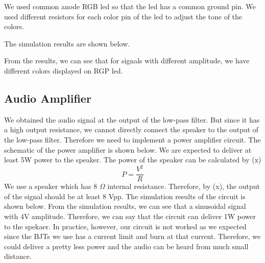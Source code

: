 \documentclass[conference]{IEEEtran}
\begin{document}
\par We used common anode RGB led so that the led has a common ground pin. We used different resistors for each color pin of the led 
to adjust the tone of the colors. 

\par The simulation results are shown below.
\par From the results, we can see that for signals with different amplitude, we have different colors displayed on RGP led.

\subsection{Audio Amplifier}
We obtained the audio signal at the output of the low-pass filter. But since it has a high output resistance, we cannot directly connect 
the speaker to the output of the low-pass filter. Therefore we need to implement a power amplifier circuit. The schematic of the power 
amplifier is shown below. 
We are expected to deliver at least 5W power to the speaker. The power of the speaker can be calculated by (x)
\begin{equation}
    P = \frac{V^2}{R}
\end{equation}
We use a speaker which has 8 \(\Omega\) internal resistance. Therefore, by (x), the output of the signal should be at least 8 Vpp. The 
simulation results of the circuit is shown below. 
From the simulation results,\cite{LM741} we can see that a sinusoidal signal with 4V amplitude. Therefore, we can say that the circuit can deliver 
1W power to the spekaer. In practice, however, our circuit is not worked as we expected since the BJTs we use has a current limit and burn 
at that current. Therefore, we could deliver a pretty less power and the audio can be heard from much small distance. 
\end{document}
